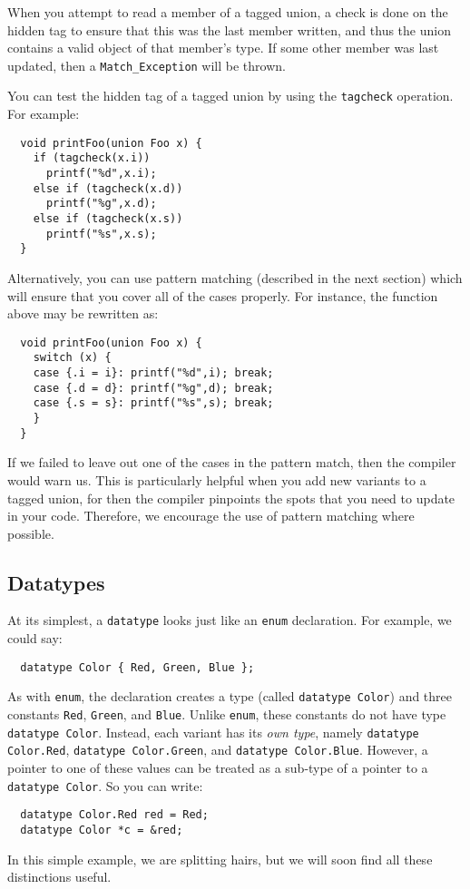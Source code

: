 When you attempt to read a member of a tagged union, a
check is done on the hidden tag to ensure that this was
the last member written, and thus the union contains a
valid object of that member's type.  If some other member
was last updated, then a \texttt{Match_Exception} will
be thrown.  

You can test the hidden tag of a tagged union by using
the \texttt{tagcheck} operation.  For example:
\begin{verbatim}
  void printFoo(union Foo x) {
    if (tagcheck(x.i))
      printf("%d",x.i);
    else if (tagcheck(x.d))
      printf("%g",x.d);
    else if (tagcheck(x.s))
      printf("%s",x.s);
  }
\end{verbatim}
Alternatively, you can use pattern matching (described
in the next section) which will ensure that you cover
all of the cases properly.  For instance, the function
above may be rewritten as:
\begin{verbatim}
  void printFoo(union Foo x) {
    switch (x) {
    case {.i = i}: printf("%d",i); break;
    case {.d = d}: printf("%g",d); break;
    case {.s = s}: printf("%s",s); break;
    }
  }
\end{verbatim}
If we failed to leave out one of the cases in the
pattern match, then the compiler would warn us.  This
is particularly helpful when you add new variants to
a tagged union, for then the compiler pinpoints the
spots that you need to update in your code.  Therefore,
we encourage the use of pattern matching where possible.

\subsection{Datatypes}\hypertarget{datatype_sec}{}

At its simplest, a \texttt{datatype} looks just like an \texttt{enum} 
declaration.  For example, we could say:
\begin{verbatim}
  datatype Color { Red, Green, Blue };
\end{verbatim}

As with \texttt{enum}, the declaration creates a type (called
\texttt{datatype Color}) and three constants \texttt{Red}, \texttt{Green}, and
\texttt{Blue}.  Unlike \texttt{enum}, these constants do not have type
\texttt{datatype Color}.  Instead, each variant has its \textit{own type},
namely \texttt{datatype Color.Red}, \texttt{datatype Color.Green}, and
\texttt{datatype Color.Blue}.  However, a pointer to one of these values
can be treated as a sub-type of a pointer to a 
\texttt{datatype Color}.  So you can write:
\begin{verbatim}
  datatype Color.Red red = Red;
  datatype Color *c = &red;
\end{verbatim}
In this simple example, we are splitting hairs, but we will soon find
all these distinctions useful.

